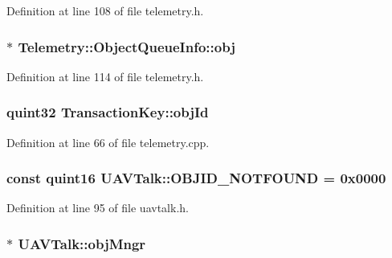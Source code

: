 \-Definition at line 108 of file telemetry.\-h.

\hypertarget{group___u_a_v_talk_plugin_ga467e2ec75abb2e4535cac1d8cc872692}{
\subsubsection[{obj}]{$\ast$ \-Telemetry\-::\-Object\-Queue\-Info\-::obj}}\label{group___u_a_v_talk_plugin_ga467e2ec75abb2e4535cac1d8cc872692}


\-Definition at line 114 of file telemetry.\-h.

\hypertarget{group___u_a_v_talk_plugin_ga23b79980c6f897e84ca1b88c5bb532ad}{
\subsubsection[{obj\-Id}]{\setlength{\rightskip}{0pt plus 5cm}quint32 {\bf \-Transaction\-Key\-::obj\-Id}}}\label{group___u_a_v_talk_plugin_ga23b79980c6f897e84ca1b88c5bb532ad}


\-Definition at line 66 of file telemetry.\-cpp.

\hypertarget{group___u_a_v_talk_plugin_gaa627c86aec4d382c9744541688fb66ef}{
\subsubsection[{\-O\-B\-J\-I\-D\-\_\-\-N\-O\-T\-F\-O\-U\-N\-D}]{\setlength{\rightskip}{0pt plus 5cm}const quint16 {\bf \-U\-A\-V\-Talk\-::\-O\-B\-J\-I\-D\-\_\-\-N\-O\-T\-F\-O\-U\-N\-D} = 0x0000}}\label{group___u_a_v_talk_plugin_gaa627c86aec4d382c9744541688fb66ef}


\-Definition at line 95 of file uavtalk.\-h.

\hypertarget{group___u_a_v_talk_plugin_ga096422f1ff46ea45de07a92c41827aa5}{
\subsubsection[{obj\-Mngr}]{$\ast$ {\bf \-U\-A\-V\-Talk\-::obj\-Mngr}}}\label{group___u_a_v_talk_plugin_ga096422f1ff46ea45de07a92c41827aa5}


